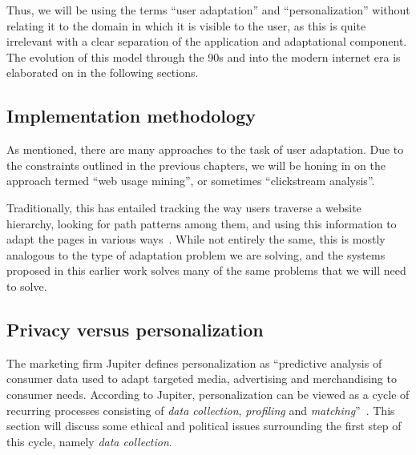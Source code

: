 Thus, we will be using the terms ``user adaptation'' and ``personalization'' without relating it to the domain in which it is visible to the user, as this is quite irrelevant with a clear separation of the application and adaptational component. The evolution of this model through the 90s and into the modern internet era is elaborated on in the following sections.

\subsection{Implementation methodology}

As mentioned, there are many approaches to the task of user adaptation. Due to the constraints outlined in the previous chapters, we will be honing in on the approach termed ``web usage mining'', or sometimes ``clickstream analysis''.

Traditionally, this has entailed tracking the way users traverse a website hierarchy, looking for path patterns among them, and using this information to adapt the pages in various ways~\cite{Mobasher2000,Eirinaki2003,Montgomery2009}. While not entirely the same, this is mostly analogous to the type of adaptation problem we are solving, and the systems proposed in this earlier work solves many of the same problems that we will need to solve.

%
%

\subsection{Privacy versus personalization}
\label{survey:sec:privacy_vs_personalization}

The marketing firm Jupiter defines personalization as ``predictive analysis of consumer data used to adapt targeted media, advertising and merchandising to consumer needs. According to Jupiter, personalization can be viewed as a cycle of recurring processes consisting of \emph{data collection}, \emph{profiling} and \emph{matching}''~\cite{Foster2000}. This section will discuss some ethical and political issues surrounding the first step of this cycle, namely \emph{data collection}.

